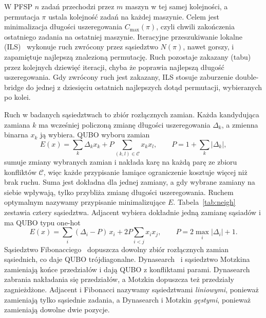 \documentclass[runningheads]{llncs}
\begin{document}
W PFSP $n$ zadań przechodzi przez $m$ maszyn w tej samej kolejności,
a permutacja $\pi$ ustala kolejność zadań na każdej maszynie. Celem jest
minimalizacja długości uszeregowania $C_{\max}(\pi)$, czyli chwili
zakończenia ostatniego zadania na ostatniej maszynie. Iteracyjne
przeszukiwanie lokalne (ILS)~\cite{lourenco2003} wykonuje ruch zwrócony przez sąsiedztwo $N(\pi)$, nawet gorszy, i zapamiętuje najlepszą znalezioną
permutację. Ruch pozostaje zakazany (tabu) przez kolejnych dziewięć iteracji,
chyba że poprawia najlepszą długość uszeregowania. Gdy zwrócony ruch jest
zakazany, ILS stosuje zaburzenie double-bridge do jednej z dziesięciu
ostatnich najlepszych dotąd permutacji, wybieranych po kolei.

Ruch w badanych sąsiedztwach to zbiór rozłącznych zamian. Każda kandydująca
zamiana $k$ ma wcześniej policzoną zmianę długości uszeregowania $\Delta_k$,
a zmienna binarna $x_k$ ją wybiera. QUBO wyboru zamian~\cite{lucas2014ising}
\begin{equation}
  E(x) = \sum_k \Delta_k x_k + P \sum_{(k,l) \in \mathcal{C}} x_k x_l ,
  \qquad P = 1 + \sum_k |\Delta_k| ,
\end{equation}
sumuje zmiany wybranych zamian i nakłada karę na każdą parę ze zbioru
konfliktów $\mathcal{C}$, więc każde przypisanie łamiące ograniczenie kosztuje
więcej niż brak ruchu. Suma jest dokładna dla jednej zamiany, a gdy wybrane
zamiany na siebie wpływają, tylko przybliża zmianę długości uszeregowania.
Ruchem optymalnym nazywamy przypisanie minimalizujące
$E$. Tabela~\ref{tab:neigh} zestawia cztery sąsiedztwa. Adjacent wybiera
dokładnie jedną zamianę sąsiadów i ma QUBO typu one-hot
\begin{equation}
  E(x) = \sum_i (\Delta_i - P)\,x_i + 2P \sum_{i<j} x_i x_j ,
  \qquad P = 2\max_i|\Delta_i| + 1 .
\end{equation}
Sąsiedztwo
Fibonacciego~\cite{bozejko2026new} dopuszcza dowolny zbiór rozłącznych zamian
sąsiednich, co daje QUBO trójdiagonalne. Dynasearch~\cite{congram2002}
i sąsiedztwo Motzkina~\cite{wojewodzki2026soco} zamieniają końce przedziałów
i dają QUBO z konfliktami parami. Dynasearch zabrania nakładania się
przedziałów, a Motzkin dopuszcza też przedziały zagnieżdżone. Adjacent
i Fibonacci nazywamy sąsiedztwami \emph{liniowymi}, ponieważ zamieniają tylko
sąsiednie zadania, a Dynasearch i Motzkin \emph{gęstymi}, ponieważ zamieniają dowolne dwie pozycje.
\end{document}
